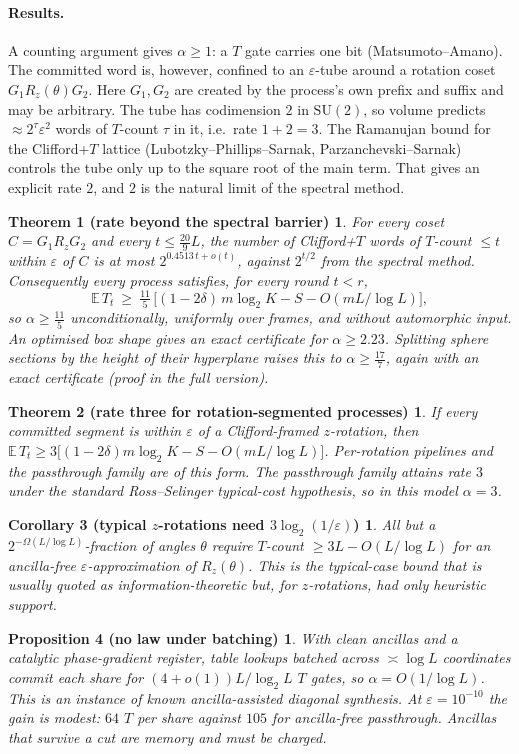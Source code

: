 \documentclass[11pt]{article}
\newcommand{\E}{\mathbb E}
\newtheorem*{thmA}{Theorem 1 (rate beyond the spectral barrier)}
\newtheorem*{thmB}{Theorem 2 (rate three for rotation-segmented processes)}
\newtheorem*{corC}{Corollary 3 (typical $z$-rotations need $3\log_2(1/\varepsilon)$)}
\newtheorem*{propD}{Proposition 4 (no law under batching)}
\begin{document}
\paragraph{Results.} A counting argument gives $\alpha\ge1$: a $T$ gate carries one bit (Matsumoto--Amano). The committed word is, however, confined to an $\varepsilon$-tube around a rotation coset $G_1R_z(\theta)G_2$. Here $G_1,G_2$ are created by the process's own prefix and suffix and may be arbitrary. The tube has codimension $2$ in $\mathrm{SU}(2)$, so volume predicts $\approx2^\tau\varepsilon^2$ words of $T$-count $\tau$ in it, i.e.\ rate $1+2=3$. The Ramanujan bound for the Clifford+$T$ lattice (Lubotzky--Phillips--Sarnak, Parzanchevski--Sarnak) controls the tube only up to the square root of the main term. That gives an explicit rate $2$, and $2$ is the natural limit of the spectral method.
\begin{thmA}
For every coset $C=G_1R_zG_2$ and every $t\le\frac{20}9L$, the number of Clifford+$T$ words of $T$-count $\le t$ within $\varepsilon$ of $C$ is at most $2^{0.4513\,t+o(t)}$, against $2^{t/2}$ from the spectral method. Consequently every process satisfies, for every round $t<r$,
\[
\E\,T_t\ \ge\ \tfrac{11}5\,\big[(1-2\delta)\,m\log_2K-S-O(mL/\log L)\big],
\]
so $\alpha\ge\frac{11}5$ unconditionally, uniformly over frames, and without automorphic input. An optimised box shape gives an exact certificate for $\alpha\ge2.23$. Splitting sphere sections by the height of their hyperplane raises this to $\alpha\ge\frac{17}7$, again with an exact certificate (proof in the full version).
\end{thmA}
\begin{thmB}
If every committed segment is within $\varepsilon$ of a Clifford-framed $z$-rotation, then $\E\,T_t\ge3\big[(1-2\delta)m\log_2K-S-O(mL/\log L)\big]$. Per-rotation pipelines and the passthrough family are of this form. The passthrough family attains rate $3$ under the standard Ross--Selinger typical-cost hypothesis, so in this model $\alpha=3$.
\end{thmB}
\begin{corC}
All but a $2^{-\Omega(L/\log L)}$-fraction of angles $\theta$ require $T$-count $\ge3L-O(L/\log L)$ for an ancilla-free $\varepsilon$-approximation of $R_z(\theta)$. This is the typical-case bound that is usually quoted as information-theoretic but, for $z$-rotations, had only heuristic support.
\end{corC}
\begin{propD}
With clean ancillas and a catalytic phase-gradient register, table lookups batched across $\asymp\log L$ coordinates commit each share for $(4+o(1))L/\log_2L$ $T$ gates, so $\alpha=O(1/\log L)$. This is an instance of known ancilla-assisted diagonal synthesis. At $\varepsilon=10^{-10}$ the gain is modest: $64$ $T$ per share against $105$ for ancilla-free passthrough. Ancillas that survive a cut are memory and must be charged.
\end{propD}
\end{document}
